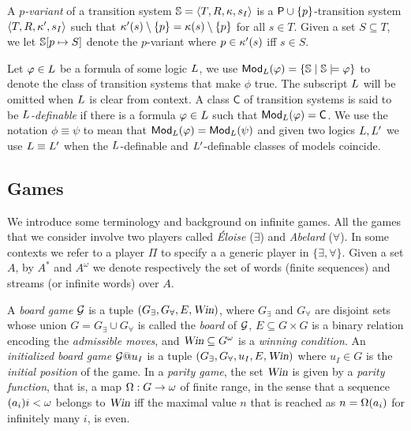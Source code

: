 A \emph{$p$-variant} of a transition system $\mathbb{S} = \langle{T,R,\kappa,s_I}\rangle$
is a $\mathsf{P}\cup\{p\}$-transition system $\langle{T,R,\kappa',s_I}\rangle$
such that $\kappa'(s)\setminus\{p\} = \kappa(s) \setminus \{p \}$ for all 
$s \in T$.
Given a set $S \subseteq T$, we let $\mathbb{S}[p\mapsto S]$ denote the $p$-variant
where $p \in \kappa'(s)$ iff $s \in S$.

Let $\varphi \in L$ be a formula of some logic $L$,
we use $\mathsf{Mod}_{L}(\varphi) = \{\mathbb{S} \mid \mathbb{S} \models \varphi\}$ to denote 
the class of transition systems that make $\phi$ true.
The subscript $L$ will be omitted when $L$ is clear from context.
A class $\mathsf{C}$ of transition systems is said to be 
\emph{$L$-definable} if there is a formula $\varphi \in L$ such that
$\mathsf{Mod}_{L}(\varphi) = \mathsf{C}$.
We use the notation $\phi \equiv \psi$ to mean that $\mathsf{Mod}_{L}(\varphi) = 
\mathsf{Mod}_{L}(\psi)$ and given two logics $L, L'$ we use $L \equiv 
L'$ when the $L$-definable and $L'$-definable classes of 
models coincide.


\subsection{Games}

We introduce some terminology and background on infinite games.
All the games that we consider involve two players called \emph{\'Eloise}
($\exists$) and \emph{Abelard} ($\forall$).
In some contexts we refer to a player $\Pi$ to specify a
a generic player in $\{\exists,\forall\}$.
%
Given a set $A$, by $A^*$ and $A^\omega$ we denote respectively the set of
words (finite sequences) and streams (or infinite words) over $A$.

A \emph{board game} $\mathcal{G}$ is a tuple $(G_{\exists},G_{\forall},E,\win)$,
where $G_{\exists}$ and $G_{\forall}$ are disjoint sets whose union
$G=G_{\exists}\cup G_{\forall}$ is called the \emph{board} of $\mathcal{G}$,
$E\subseteq G \times G$ is a binary relation encoding the \emph{admissible
moves}, and $\win \subseteq G^{\omega}$ is a \emph{winning condition}.
An \emph{initialized board game} $\mathcal{G}@u_I$ is a tuple
$(G_{\exists},G_{\forall},u_I, E,\win)$ where
$u_I \in G$ is the
\emph{initial position} of the game.
In a \emph{parity game}, the set $\win$ is  given by a \emph{parity function},
that is, a map $\Omega: G \to \omega$ of finite range, in the sense that a
sequence $(a_{i})i<\omega$ belongs to $\win$ iff the maximal value $n$ that 
is reached as $n = \Omega(a_{i})$ for infinitely many $i$, is even.


